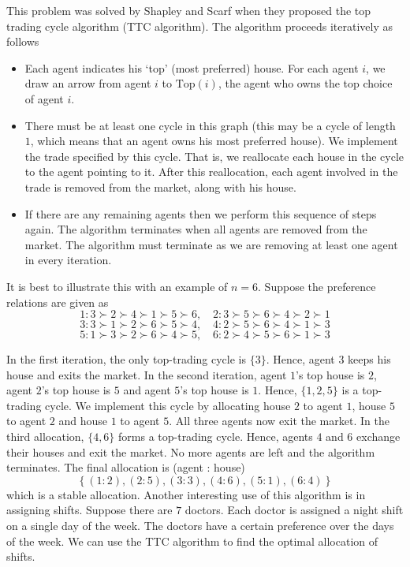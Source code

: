 \documentclass{article}
\theoremstyle{definition}
\begin{document}
This problem was solved by Shapley and Scarf when they proposed the top trading cycle algorithm (TTC algorithm). The algorithm proceeds iteratively as follows
\begin{itemize}
    \item Each agent indicates his `top' (most preferred) house. For each agent $i$, we draw an arrow from agent $i$ to $\mathrm{Top}(i)$, the agent who owns the top choice of agent $i$.
    \item There must be at least one cycle in this graph (this may be a cycle of length $1$, which means that an agent owns his most preferred house). We implement the trade specified by this cycle. That is, we reallocate each house in the cycle to the agent pointing to it. After this reallocation, each agent involved in the trade is removed from the market, along with his house.
    \item If there are any remaining agents then we perform this sequence of steps again. The algorithm terminates when all agents are removed from the market. The algorithm must terminate as we are removing at least one agent in every iteration.
\end{itemize}

It is best to illustrate this with an example of $n=6$. Suppose the preference relations are given as
\[
    1 \colon 3 \succ 2 \succ 4 \succ 1 \succ 5 \succ 6, \quad 2 \colon 3 \succ 5 \succ 6 \succ 4 \succ 2 \succ 1
\]
\[
    3 \colon 3 \succ 1 \succ 2 \succ 6 \succ 5 \succ 4, \quad 4 \colon 2 
    \succ 5 \succ 6 \succ 4 \succ 1 \succ 3
\]
\[
    5 \colon 1 \succ 3 \succ 2 \succ 6 \succ 4 \succ 5, \quad 6 \colon 2 \succ 4 \succ 5 \succ 6 \succ 1 \succ 3
\]

In the first iteration, the only top-trading cycle is $\{3\}$. Hence, agent $3$ keeps his house and exits the market. In the second iteration, agent $1$'s top house is $2$, agent $2$'s top house is $5$ and agent $5$'s top house is $1$. Hence, $\{ 1,2,5\}$ is a top-trading cycle. We implement this cycle by allocating house $2$ to agent $1$, house $5$ to agent $2$ and house $1$ to agent $5$. All three agents now exit the market. In the third allocation, $\{4,6\}$ forms a top-trading cycle. Hence, agents $4$ and $6$ exchange their houses and exit the market. No more agents are left and the algorithm terminates. The final allocation is (agent : house) 
\[
    \left\{ (1 \colon 2), (2 \colon 5), (3 \colon 3), (4 \colon 6), (5 \colon 1), (6 \colon 4) \right\} 
\]
which is a stable allocation. Another interesting use of this algorithm is in assigning shifts. Suppose there are $7$ doctors. Each doctor is assigned a  night shift on a single day of the week. The doctors have a certain preference over the days of the week. We can use the TTC algorithm to find the optimal allocation of shifts.
\end{document}
